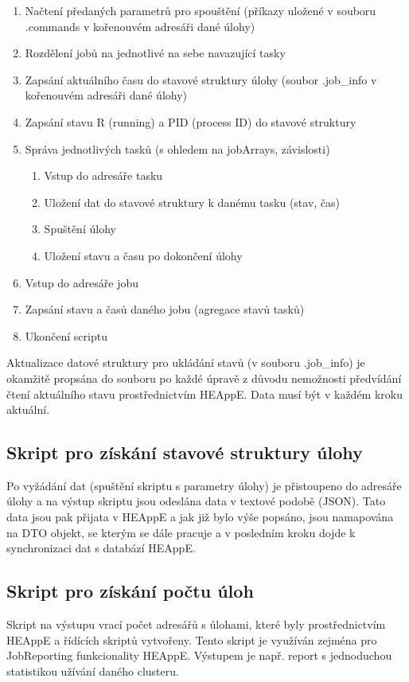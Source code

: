 \begin{enumerate}
	\item Načtení předaných parametrů pro spouštění (příkazy uložené v souboru .commands v kořenouvém adresáři dané úlohy)
	\item Rozdělení jobů na jednotlivé na sebe navazující tasky
	\item Zapsání aktuálního času do stavové struktury úlohy (soubor .job\_info v kořenouvém adresáři dané úlohy)
	\item Zapsání stavu R (running) a PID (process ID) do stavové struktury
	\item Správa jednotlivých tasků (s ohledem na jobArrays, závislosti)
	\begin{enumerate}
		\item Vstup do adresáře tasku
		\item Uložení dat do stavové struktury k danému tasku (stav, čas)
		\item Spuštění úlohy
		\item Uložení stavu a času po dokončení úlohy
	\end{enumerate}
	\item Vstup do adresáře jobu
	\item Zapsání stavu a časů daného jobu (agregace stavů tasků)
	\item Ukončení scriptu
\end{enumerate}

Aktualizace datové struktury pro ukládání stavů (v souboru .job\_info) je okamžitě propsána do souboru po každé úpravě z důvodu nemožnosti předvídání čtení aktuálního stavu prostřednictvím HEAppE. Data musí být v každém kroku aktuální.

\subsection{Skript pro získání stavové struktury úlohy}
Po vyžádání dat (spuštění skriptu s parametry úlohy) je přistoupeno do adresáře úlohy a na výstup skriptu jsou odeslána data v textové podobě (JSON). Tato data jsou pak přijata v HEAppE a jak již bylo výše popsáno, jsou namapována na DTO objekt, se kterým se dále pracuje a v posledním kroku dojde k synchronizaci dat s databází HEAppE.

\subsection{Skript pro získání počtu úloh}
Skript na výstupu vrací počet adresářů s úlohami, které byly prostřednictvím HEAppE a řídících skriptů vytvořeny. Tento skript je využíván zejména pro JobReporting funkcionality HEAppE. Výstupem je např. report s jednoduchou statistikou užívání daného clusteru.

